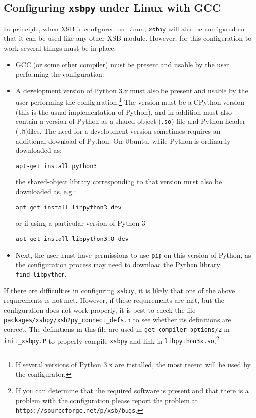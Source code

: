 \subsection{Configuring {\tt xsbpy} under Linux with GCC}

In principle, when XSB is configured on Linux, {\tt xsbpy} will also
be configured so that it can be used like any other XSB module.
However, for this configuration to work several things must be in
place.

\begin{itemize}
\item GCC (or some other compiler) must be present and usable by the
  user performing the configuration.

\item A development version of Python 3.x must also be present and
  usable by the user performing the configuration.\footnote{If several
    versions of Python 3.x are installed, the most recent will be used
    by the configurator.}  The version must be a CPython version (this
  is the usual implementation of Python), and in addition must also
  contain a version of Python as a shared object ({\tt .so}) file and
  Python header ({\tt .h})files.  The need for a development version
  sometimes requires an additional download of Python.  On Ubuntu,
  while Python is ordinarily downloaded as:

  {\tt apt-get install python3}

\noindent
the shared-object library corresponding to that version must also be
downloaded as, e.g.:

{\tt apt-get install libpython3-dev}

or if using a particular version of Python-3

{\tt apt-get install libpython3.8-dev}

\item Next, the user must have permissions to use {\tt pip} on this
  version of Python, as the configuration process may need to download
  the Python library {\tt find\_libpython}.
\end{itemize}

If there are difficulties in configuring {\tt xsbpy}, it is likely
that one of the above requirements is not met.  However, if these
requirements are met, but the configuration does not work properly, it
is best to check the file {\tt packages/xsbpy/xsb2py\_connect\_defs.h} to see whether
its definitions are correct.  The definitions in this file are used in
{\tt get\_compiler\_options/2} in {\tt init\_xsbpy.P} to properly
compile {\tt xsbpy} and link in {\tt libpython3x.so}.\footnote{If you
  can determine that the required software is present and that there
  is a problem with the configuration please report the problem at
  {\tt https://sourceforge.net/p/xsb/bugs}.}

